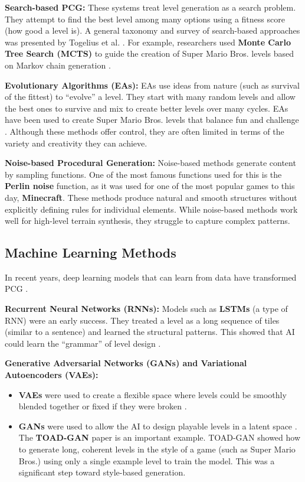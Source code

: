 \documentclass[conference]{IEEEtran}
\begin{document}
\textbf{Search-based PCG:} These systems treat level generation as a search problem. They attempt to find the best level among many options using a fitness score (how good a level is). A general taxonomy and survey of search-based approaches was presented by Togelius et al. \cite{togelius2011search}. For example, researchers used \textbf{Monte Carlo Tree Search (MCTS)} to guide the creation of Super Mario Bros. levels based on Markov chain generation \cite{summerville2015mcts}.
    
\textbf{Evolutionary Algorithms (EAs):} EAs use ideas from nature (such as survival of the fittest) to ``evolve'' a level. They start with many random levels and allow the best ones to survive and mix to create better levels over many cycles. EAs have been used to create Super Mario Bros. levels that balance fun and challenge \cite{horn2014mario}. Although these methods offer control, they are often limited in terms of the variety and creativity they can achieve.

\textbf{Noise-based Procedural Generation:} 
Noise-based methods generate content by sampling functions. One of the most famous functions used for this is the \textbf{Perlin noise} function, as it was used for one of the most popular games to this day, \textbf{Minecraft}. These methods produce natural and smooth structures without explicitly defining rules for individual elements. While noise-based methods work well for high-level terrain synthesis, they struggle to capture complex patterns.

\subsection{Machine Learning Methods}
In recent years, deep learning models that can learn from data have transformed PCG \cite{summerville2018pcgml}.
    
\textbf{Recurrent Neural Networks (RNNs):} Models such as \textbf{LSTMs} (a type of RNN) were an early success. They treated a level as a long sequence of tiles (similar to a sentence) and learned the structural patterns. This showed that AI could learn the ``grammar'' of level design \cite{summerville2016lstm}.
    
\textbf{Generative Adversarial Networks (GANs) and Variational Autoencoders (VAEs):}
\begin{itemize}
    \item \textbf{VAEs} were used to create a flexible space where levels could be smoothly blended together or fixed if they were broken \cite{sarkar2020levelblending}.
    \item \textbf{GANs} were used to allow the AI to design playable levels in a latent space \cite{volz2018gan}. The \textbf{TOAD-GAN} paper \cite{awiszus2020toadgan} is an important example. TOAD-GAN showed how to generate long, coherent levels in the style of a game (such as Super Mario Bros.) using only a single example level to train the model. This was a significant step toward style-based generation.
\end{itemize}
\end{document}
